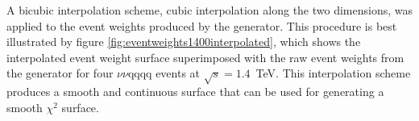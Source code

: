 A bicubic interpolation scheme, cubic interpolation along the two dimensions, was applied to the event weights produced by the generator.  This procedure is best illustrated by figure \ref{fig:eventweights1400interpolated}, which shows the interpolated event weight surface superimposed with the raw event weights from the generator for four $\nu\nu\text{qqqq}$ events at $\sqrt{s}=1.4$~TeV.  This interpolation scheme produces a smooth and continuous surface that can be used for generating a smooth $\chi^{2}$ surface.  

\begin{figure}[h!]
\centering
{}
 \hfill
{}

\end{figure}
